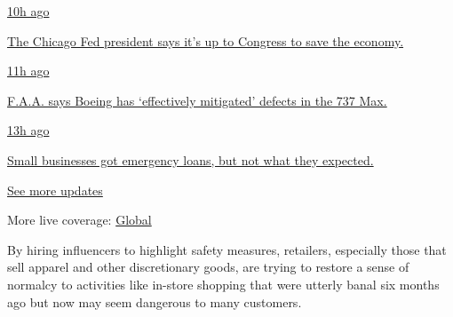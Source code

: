 \href{https://www.nytimes3xbfgragh.onion/live/2020/08/03/business/stock-market-today-coronavirus?action=click\&pgtype=Article\&state=default\&region=MAIN_CONTENT_1\&context=storylines_live_updates\#the-chicago-fed-president-says-its-up-to-congress-to-save-the-economy}{10h
ago}

\href{https://www.nytimes3xbfgragh.onion/live/2020/08/03/business/stock-market-today-coronavirus?action=click\&pgtype=Article\&state=default\&region=MAIN_CONTENT_1\&context=storylines_live_updates\#the-chicago-fed-president-says-its-up-to-congress-to-save-the-economy}{The
Chicago Fed president says it's up to Congress to save the economy.}

\href{https://www.nytimes3xbfgragh.onion/live/2020/08/03/business/stock-market-today-coronavirus?action=click\&pgtype=Article\&state=default\&region=MAIN_CONTENT_1\&context=storylines_live_updates\#faa-says-boeing-has-effectively-mitigated-defects-in-the-737-max}{11h
ago}

\href{https://www.nytimes3xbfgragh.onion/live/2020/08/03/business/stock-market-today-coronavirus?action=click\&pgtype=Article\&state=default\&region=MAIN_CONTENT_1\&context=storylines_live_updates\#faa-says-boeing-has-effectively-mitigated-defects-in-the-737-max}{F.A.A.
says Boeing has `effectively mitigated' defects in the 737 Max.}

\href{https://www.nytimes3xbfgragh.onion/live/2020/08/03/business/stock-market-today-coronavirus?action=click\&pgtype=Article\&state=default\&region=MAIN_CONTENT_1\&context=storylines_live_updates\#small-businesses-got-emergency-loans-but-not-what-they-expected}{13h
ago}

\href{https://www.nytimes3xbfgragh.onion/live/2020/08/03/business/stock-market-today-coronavirus?action=click\&pgtype=Article\&state=default\&region=MAIN_CONTENT_1\&context=storylines_live_updates\#small-businesses-got-emergency-loans-but-not-what-they-expected}{Small
businesses got emergency loans, but not what they expected.}

\href{https://www.nytimes3xbfgragh.onion/live/2020/08/03/business/stock-market-today-coronavirus?action=click\&pgtype=Article\&state=default\&region=MAIN_CONTENT_1\&context=storylines_live_updates}{See
more updates}

More live coverage:
\href{https://www.nytimes3xbfgragh.onion/2020/08/03/world/coronavirus-covid-19.html?action=click\&pgtype=Article\&state=default\&region=MAIN_CONTENT_1\&context=storylines_live_updates}{Global}

By hiring influencers to highlight safety measures, retailers,
especially those that sell apparel and other discretionary goods, are
trying to restore a sense of normalcy to activities like in-store
shopping that were utterly banal six months ago but now may seem
dangerous to many customers.

